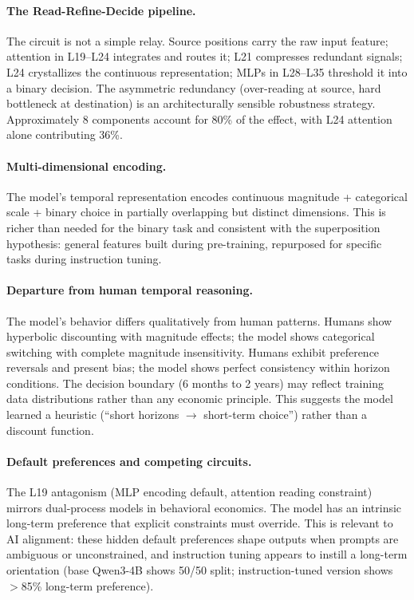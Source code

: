 \documentclass{article}
\begin{document}
\paragraph{The Read-Refine-Decide pipeline.} The circuit is not a simple relay. Source positions carry the raw input feature; attention in L19--L24 integrates and routes it; L21 compresses redundant signals; L24 crystallizes the continuous representation; MLPs in L28--L35 threshold it into a binary decision. The asymmetric redundancy (over-reading at source, hard bottleneck at destination) is an architecturally sensible robustness strategy. Approximately 8 components account for 80\% of the effect, with L24 attention alone contributing 36\%.

\paragraph{Multi-dimensional encoding.} The model's temporal representation encodes continuous magnitude + categorical scale + binary choice in partially overlapping but distinct dimensions. This is richer than needed for the binary task and consistent with the superposition hypothesis: general features built during pre-training, repurposed for specific tasks during instruction tuning.

\paragraph{Departure from human temporal reasoning.} The model's behavior differs qualitatively from human patterns. Humans show hyperbolic discounting with magnitude effects; the model shows categorical switching with complete magnitude insensitivity. Humans exhibit preference reversals and present bias; the model shows perfect consistency within horizon conditions. The decision boundary (6 months to 2 years) may reflect training data distributions rather than any economic principle. This suggests the model learned a heuristic (``short horizons $\rightarrow$ short-term choice'') rather than a discount function.

\paragraph{Default preferences and competing circuits.} The L19 antagonism (MLP encoding default, attention reading constraint) mirrors dual-process models in behavioral economics. The model has an intrinsic long-term preference that explicit constraints must override. This is relevant to AI alignment: these hidden default preferences shape outputs when prompts are ambiguous or unconstrained, and instruction tuning appears to instill a long-term orientation (base Qwen3-4B shows 50/50 split; instruction-tuned version shows $>$85\% long-term preference).
\end{document}
